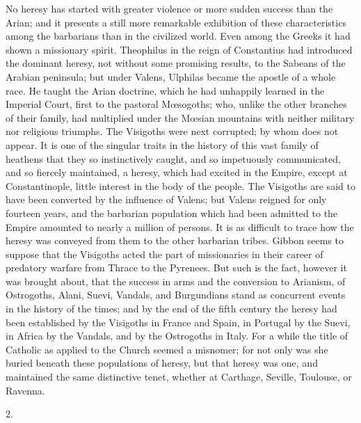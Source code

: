 No heresy has started with greater violence or more sudden
success than the Arian; and it presents a still more remarkable
exhibition of these characteristics among the barbarians than in the
civilized world. Even among the Greeks it had shown a missionary
spirit. Theophilus in the reign of Constantius had introduced the
dominant heresy, not without some promising results, to the Sabeans of
the Arabian peninsula; but under Valens, Ulphilas became the apostle
of a whole race. He taught the Arian doctrine, which he had unhappily
learned in the Imperial Court, first to the pastoral Mœsogoths; who,
unlike the other branches of their family, had multiplied under the Mœsian mountains with neither military nor religious triumphs. The
Visigoths were next corrupted; by whom does not appear. It is one of
the singular traits in the history of this vast family of heathens
that they so instinctively caught, and so impetuously communicated,
and so fiercely maintained, a heresy, which had excited in the Empire,
except at Constantinople, little interest in the body of the people.
The Visigoths are said to have been converted by the influence of
Valens; but Valens reigned for only fourteen years, and the barbarian
population which had been admitted to the Empire amounted to nearly a
million of persons. It is as difficult to trace how the heresy was
conveyed from them to the other barbarian tribes. Gibbon seems to
suppose that the Visigoths acted the part of missionaries in their
career of predatory warfare from Thrace to the Pyrenees. But such is
the fact, however it was brought about, that the success in arms and
the conversion to Arianism, of Ostrogoths, Alani, Suevi, Vandals, and
Burgundians stand as concurrent events in the history of the times;
and by the end of the fifth century the heresy had been established by
the Visigoths in France and Spain, in Portugal by the Suevi, in Africa
by the Vandals, and by the Ostrogoths in Italy. For a while the title
of Catholic as applied to the Church seemed a misnomer; for not only
was she buried beneath these populations of heresy, but that heresy
was one, and maintained the same distinctive tenet, whether at
Carthage, Seville, Toulouse, or Ravenna.

2.

